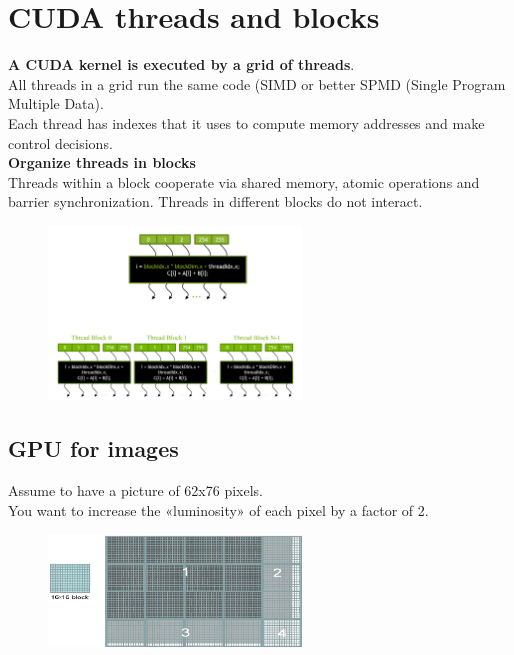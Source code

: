 \section{CUDA threads and blocks}

\textbf{A CUDA kernel is executed by a grid of threads}.\\
All threads in a grid run the same code (SIMD or better SPMD (Single Program Multiple Data).\\
Each thread has indexes that it uses to compute memory addresses and make control decisions.\\

\textbf{Organize threads in blocks}\\
Threads within a block cooperate via shared memory, atomic operations and barrier
synchronization. Threads in different blocks do not interact.

\begin{figure}[ht]
	\centering
	\includegraphics[width=0.6\textwidth]{figure_parallel/threads_blocks.png}
\end{figure}
\FloatBarrier


\subsection{GPU for images}
Assume to have a picture of 62x76 pixels.\\
You want to increase the «luminosity» of each pixel by a factor of 2.

\begin{figure}[ht]
	\centering
	\includegraphics[width=0.6\textwidth]{figure_parallel/pixel.png}
\end{figure}
\FloatBarrier

